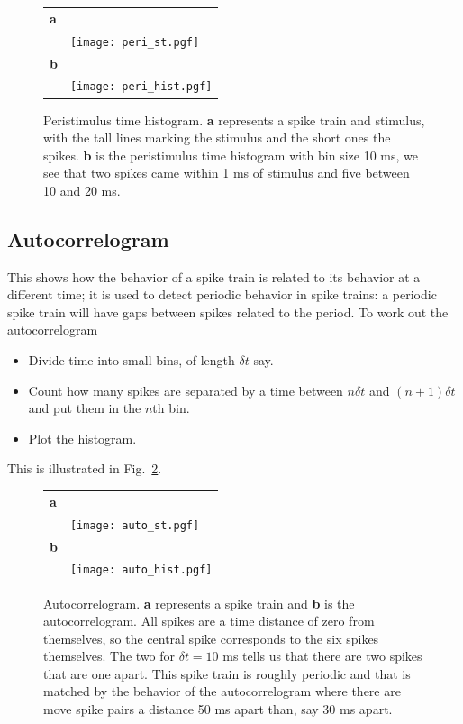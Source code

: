 \documentclass[11pt,a4paper]{scrartcl}
\begin{document}
\begin{figure}
\begin{center}
\begin{tabular}{ll}
\textbf{a}&\\
&\texttt{[image: peri\_st.pgf]}\\[1cm]
\textbf{b}&\\
&\texttt{[image: peri\_hist.pgf]}
\end{tabular}
\end{center}
\caption{Peristimulus time histogram. \textbf{a} represents a spike
  train and stimulus, with the tall lines marking the stimulus and the
  short ones the spikes. \textbf{b} is the peristimulus time histogram
  with bin size 10 ms, we see that two spikes came within 1 ms of
  stimulus and five between 10 and 20 ms.\label{peri}}
\end{figure}

\subsection*{Autocorrelogram}
This shows how the behavior of a spike train is related to its
behavior at a different time; it is used to detect periodic behavior
in spike trains: a periodic spike train will have gaps between spikes
related to the period. To work out the autocorrelogram
\begin{itemize}
\item Divide time into small bins, of length $\delta t$ say. 
\item Count how many spikes are separated by a time between $n\delta
  t$ and $(n+1)\delta t$ and put them in the $n$th bin.
\item Plot the histogram.
\end{itemize}
This is illustrated in Fig.~\ref{auto}.

\begin{figure}
\begin{center}
\begin{tabular}{ll}
\textbf{a}&\\
&\texttt{[image: auto\_st.pgf]}\\[1cm]
\textbf{b}&\\
&\texttt{[image: auto\_hist.pgf]}
\end{tabular}
\end{center}
\caption{Autocorrelogram. \textbf{a} represents a spike train and
  \textbf{b} is the autocorrelogram. All spikes are a time distance of
  zero from themselves, so the central spike corresponds to the six
  spikes themselves.  The two for $\delta t=10$ ms tells us that there are
  two spikes that are one apart. This spike train is roughly periodic
  and that is matched by the behavior of the autocorrelogram where
  there are move spike pairs a distance 50 ms apart than, say 30 ms
  apart.\label{auto}}
\end{figure}
\end{document}
